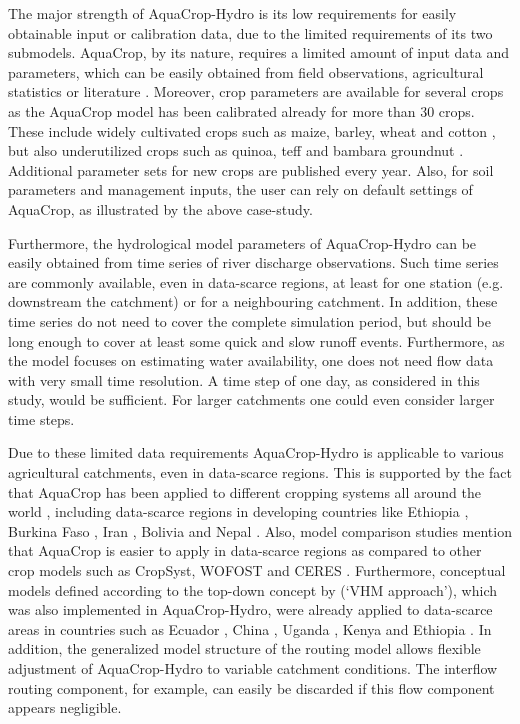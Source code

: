 The major strength of AquaCrop-Hydro is its low requirements for easily obtainable input or calibration data, due to the limited requirements of its two submodels. AquaCrop, by its nature, requires a limited amount of input data and parameters, which can be easily obtained from field observations, agricultural statistics or literature \parencite{vanuytrecht2014a}. Moreover, crop parameters are available for several crops as the AquaCrop model has been calibrated already for more than 30 crops. These include widely cultivated crops such as maize, barley, wheat and cotton \parencite{abrha2012, andarzian2011, garciavila2009, heng2009}, but also underutilized crops such as quinoa, teff and bambara groundnut \parencite{geerts2009a, mabhaudhi2014, tsegay2012}. Additional parameter sets for new crops are published every year. Also, for soil parameters and management inputs, the user can rely on default settings of AquaCrop, as illustrated by the above case-study. 

Furthermore, the hydrological model parameters of AquaCrop-Hydro can be easily obtained from time series of river discharge observations. Such time series are commonly available, even in data-scarce regions, at least for one station (e.g. downstream the catchment) or for a neighbouring catchment. In addition, these time series do not need to cover the complete simulation period, but should be long enough to cover at least some quick and slow runoff events. Furthermore, as the model focuses on estimating water availability, one does not need flow data with very small time resolution. A time step of one day, as considered in this study, would be sufficient. For larger catchments one could even consider larger time steps. 

Due to these limited data requirements AquaCrop-Hydro is applicable to various agricultural catchments, even in data-scarce regions. This is supported by the fact that AquaCrop has been  applied to different cropping systems all around the world \parencite{vanuytrecht2014a}, including data-scarce regions in developing countries like Ethiopia \parencite{abrha2012, tsegay2012}, Burkina Faso \parencite{wellens2013}, Iran \parencite{andarzian2011}, Bolivia \parencite{geerts2009a} and Nepal \parencite{shrestha2013}. Also, model comparison studies mention that AquaCrop is easier to apply in data-scarce regions as compared to other crop models such as CropSyst, WOFOST and CERES \parencite{abisaab2015, castanedavera2015,todorovic2009}. Furthermore, conceptual models defined according to the top-down concept by \textcite{willems2014a} (`VHM approach'), which was also implemented in AquaCrop-Hydro, were already applied to data-scarce areas in countries such as Ecuador \parencite{moraserrano2013}, China \parencite{liu2011}, Uganda \parencite{nyekoogiramoi2010}, Kenya and Ethiopia \parencite{taye2011}. In addition, the generalized model structure of the routing model allows flexible adjustment of AquaCrop-Hydro to variable catchment conditions. The interflow routing component, for example, can easily be discarded if this flow component appears negligible. 

